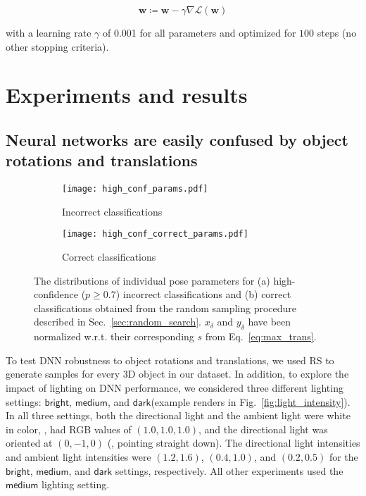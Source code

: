 \documentclass[10pt,twocolumn,letterpaper]{article}
\newcommand{\subsec}[1]{\noindent{\textbf{#1.}}}
\newcommand{\w}{\mathbf{w}}
\newcommand{\LL}{\mathcal{L}}
\newcommand{\bright}{\ensuremath{\mathsf{bright}}\xspace}
\newcommand{\medium}{\ensuremath{\mathsf{medium}}\xspace}
\newcommand{\dark}{\ensuremath{\mathsf{dark}}\xspace}
\begin{document}
\begin{equation}
\w \coloneqq \w - \gamma{\nabla \LL}(\w)
\end{equation}

\noindent
with a learning rate $\gamma$ of 0.001 for all parameters and optimized for $100$ steps (no other stopping criteria).








\section{Experiments and results}


\subsection{Neural networks are easily confused by object rotations and translations}
\label{sec:easily_confused}


\begin{figure}[h]
\begin{subfigure}{\linewidth}
    \centering
    \texttt{[image: high\_conf\_params.pdf]}
    \caption{Incorrect classifications}\label{fig:high_conf_params}
\end{subfigure}
\begin{subfigure}{\linewidth}
    \centering
    \texttt{[image: high\_conf\_correct\_params.pdf]}
    \caption{Correct classifications}\label{fig:high_conf_correct_params}
\end{subfigure}
\caption{The distributions of individual pose parameters for (a) high-confidence ($p \geq 0.7$) incorrect classifications and (b) correct classifications obtained from the random sampling procedure described in Sec.~\ref{sec:random_search}.
$x_{\delta}$ and $y_{\delta}$ have been normalized w.r.t. their corresponding $s$ from Eq.~\ref{eq:max_trans}.}
\label{fig:param_distributions}
\end{figure}


\subsec{Experiment}
To test DNN robustness to object rotations and translations, we used RS to generate samples for every 3D object in our dataset.
In addition, to explore the impact of lighting on DNN performance, we considered three different lighting settings: \bright, \medium, and \dark (example renders in Fig.~\ref{fig:light_intensity}).
In all three settings, both the directional light and the ambient light were white in color, \ie, had RGB values of $(1.0, 1.0, 1.0)$, and the directional light was oriented at $(0, -1, 0)$ (\ie, pointing straight down).
The directional light intensities and ambient light intensities were $(1.2, 1.6)$, $(0.4, 1.0)$, and $(0.2, 0.5)$ for the \bright, \medium, and \dark settings, respectively.
All other experiments used the \medium lighting setting.
\end{document}
